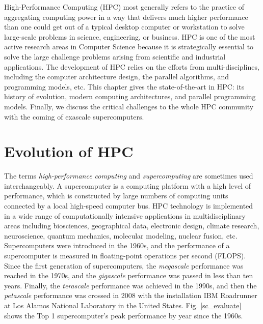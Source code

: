 \begin{displayquote}
	\textsf{High-Performance Computing (HPC) most generally refers to the practice of aggregating computing power in a way that delivers much higher performance than one could get out of a typical desktop computer or workstation to solve large-scale problems in science, engineering, or business. HPC is one of the most active research areas in Computer Science because it is strategically essential to solve the large challenge problems arising from scientific and industrial applications. The development of HPC relies on the efforts from multi-disciplines, including the computer architecture design, the parallel algorithms, and programming models, etc. This chapter gives the state-of-the-art in HPC: its history of evolution, modern computing architectures, and parallel programming models. Finally, we discuss the critical challenges to the whole HPC community with the coming of exascale supercomputers.}
\end{displayquote}

\vspace{0.6in}

\section{Evolution of HPC}

The terms \textit{high-performance computing} and \textit{supercomputing} are sometimes used interchangeably. A supercomputer is a computing platform with a high level of performance, which is constructed by large numbers of computing units connected by a local high-speed computer bus. HPC technology is implemented in a wide range of computationally intensive applications in multidisciplinary areas including biosciences, geographical data, electronic design, climate research, neuroscience, quantum mechanics, molecular modeling, nuclear fusion, etc. Supercomputers were introduced in the 1960s, and the performance of a supercomputer is measured in floating-point operations per second (FLOPS). Since the first generation of supercomputers, the \textit{megascale} performance was reached in the 1970s, and the \textit{gigascale} performance was passed in less than ten years. Finally, the \textit{terascale} performance was achieved in the 1990s, and then the \textit{petascale} performance was crossed in 2008 with the installation IBM Roadrunner at Los Alamos National Laboratory in the United States. Fig. \ref{sc_evaluate} shows the Top 1 supercomputer's peak performance by year since the 1960s.


